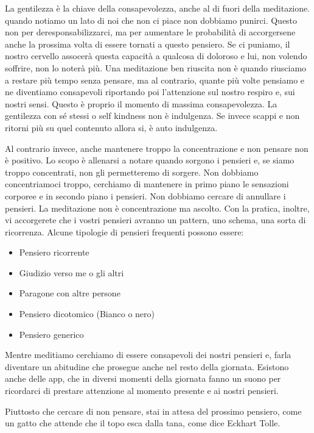 \documentclass[12pt]{book} %
\begin{document}
La gentilezza è la chiave della consapevolezza, anche al di fuori della meditazione. quando notiamo un lato di
noi che non ci piace non dobbiamo punirci. Questo non per deresponsabilizzarci, ma per aumentare le probabilità di
accorgersene anche la prossima volta di essere tornati a questo pensiero. Se ci puniamo, il nostro cervello assocerà questa capacità a qualcosa di doloroso
e lui, non volendo soffrire, non lo noterà più. Una meditazione ben riuscita non è quando riusciamo a restare più tempo
senza pensare, ma al contrario, quante più volte pensiamo e ne diventiamo consapevoli riportando poi
l'attenzione sul nostro respiro e, sui nostri sensi. Questo è proprio il momento di massima
consapevolezza. 
La gentilezza con sé stessi o self kindness non è indulgenza. Se invece scappi e non ritorni più su quel contenuto allora si, è auto indulgenza.

Al contrario invece, anche mantenere troppo la concentrazione e non pensare non è positivo. Lo scopo è allenarsi a notare quando sorgono i pensieri e, se siamo troppo concentrati, non gli permetteremo di sorgere. 
Non dobbiamo concentriamoci troppo, cerchiamo di mantenere in primo piano le sensazioni corporee e in secondo piano i pensieri. 
Non dobbiamo cercare di annullare i pensieri.
La meditazione non è concentrazione ma ascolto.
Con la pratica, inoltre, vi accorgerete che i vostri pensieri avranno un pattern, uno schema, una sorta di ricorrenza. 
Alcune tipologie di pensieri frequenti possono essere:
\begin{itemize}
\item Pensiero ricorrente
\item Giudizio verso me o gli altri
\item Paragone con altre persone
\item Pensiero dicotomico (Bianco o nero)
\item Pensiero generico
\end{itemize}

Mentre meditiamo cerchiamo di
essere consapevoli dei nostri pensieri e, farla diventare un abitudine che prosegue anche nel resto della giornata.
Esistono anche delle app, che in diversi momenti della giornata fanno un suono per ricordarci di prestare
attenzione al momento presente e ai nostri pensieri. 

Piuttosto che cercare di non pensare, stai in attesa del prossimo pensiero, come un gatto che attende che il topo esca dalla tana, come dice Eckhart Tolle.
\end{document}
